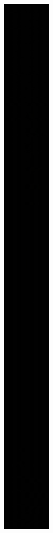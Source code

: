  \begin{figure}[!h]
\centering
\begin{subfigure}{.23\textwidth}
  \centering
  \includegraphics[scale=0.1]{img/eulerian/sample/tempp}

\end{subfigure}
\end{figure}
